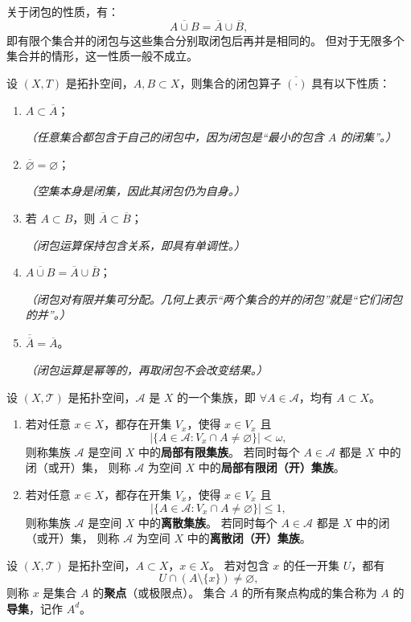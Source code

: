 关于闭包的性质，有：
\[
\overline{A\cup B} = \overline{A}\cup\overline{B},
\]
即有限个集合并的闭包与这些集合分别取闭包后再并是相同的。  
但对于无限多个集合并的情形，这一性质一般不成立。
\begin{proposition}[闭包的性质]
设 $(X,T)$ 是拓扑空间，$A,B\subset X$，则集合的闭包算子 $\overline{(\cdot)}$ 具有以下性质：
\begin{enumerate}[(1)]
  \item $A\subset \overline{A}$；
  
  \textit{（任意集合都包含于自己的闭包中，因为闭包是“最小的包含 $A$ 的闭集”。）}
  
  \item $\overline{\varnothing}=\varnothing$；
  
  \textit{（空集本身是闭集，因此其闭包仍为自身。）}
  
  \item 若 $A\subset B$，则 $\overline{A}\subset \overline{B}$；
  
  \textit{（闭包运算保持包含关系，即具有单调性。）}
  
  \item $\overline{A\cup B}=\overline{A}\cup\overline{B}$；
  
  \textit{（闭包对有限并集可分配。几何上表示“两个集合的并的闭包”就是“它们闭包的并”。）}
  
  \item $\overline{\overline{A}}=\overline{A}$。
  
  \textit{（闭包运算是幂等的，再取闭包不会改变结果。）}
\end{enumerate}
\end{proposition}
\begin{definition}
设 $(X,\mathcal{T})$ 是拓扑空间，$\mathcal{A}$ 是 $X$ 的一个集族，即 $\forall A\in\mathcal{A}$，均有 $A\subset X$。

\begin{enumerate}[(1)]
  \item 若对任意 $x\in X$，都存在开集 $V_x$，使得 $x\in V_x$ 且
  \[
  |\{A\in\mathcal{A} : V_x\cap A\ne\varnothing\}| < \omega,
  \]
  则称集族 $\mathcal{A}$ 是空间 $X$ 中的\textbf{局部有限集族}。  
  若同时每个 $A\in\mathcal{A}$ 都是 $X$ 中的闭（或开）集，
  则称 $\mathcal{A}$ 为空间 $X$ 中的\textbf{局部有限闭（开）集族}。

  \item 若对任意 $x\in X$，都存在开集 $V_x$，使得 $x\in V_x$ 且
  \[
  |\{A\in\mathcal{A} : V_x\cap A\ne\varnothing\}|\le 1,
  \]
  则称集族 $\mathcal{A}$ 是空间 $X$ 中的\textbf{离散集族}。  
  若同时每个 $A\in\mathcal{A}$ 都是 $X$ 中的闭（或开）集，
  则称 $\mathcal{A}$ 为空间 $X$ 中的\textbf{离散闭（开）集族}。
\end{enumerate}
\end{definition}
\begin{definition}[聚点的最新定义]
设 $(X,\mathcal{T})$ 是拓扑空间，$A\subset X$，$x\in X$。  
若对包含 $x$ 的任一开集 $U$，都有
\[
U \cap (A \setminus \{x\}) \ne \varnothing,
\]
则称 $x$ 是集合 $A$ 的\textbf{聚点}（或极限点）。  
集合 $A$ 的所有聚点构成的集合称为 $A$ 的\textbf{导集}，记作 $A^{d}$。
\end{definition}


